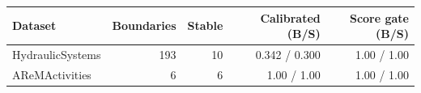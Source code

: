 \begin{tabular}{lrrrr}
\toprule
Dataset & Boundaries & Stable & Calibrated (B/S) & Score gate (B/S) \\
\midrule
HydraulicSystems & 193 & 10 & 0.342 / 0.300 & 1.00 / 1.00 \\
AReMActivities & 6 & 6 & 1.00 / 1.00 & 1.00 / 1.00 \\
\bottomrule
\end{tabular}
